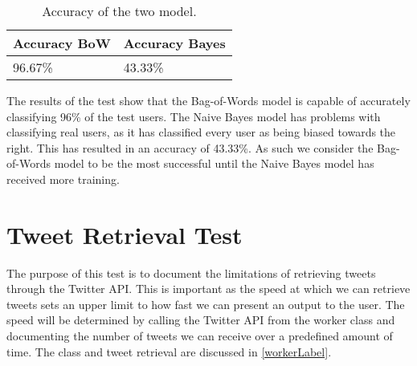 \begin{table}[H]\centering
{}
\caption{Results from the accuracy test.}
\label{speedTestReslabel}
\end{table}




\begin{table}[H]\centering
\begin{tabular}{|l|l|}\hline
\textbf{Accuracy BoW}	&	\textbf{Accuracy Bayes}	\\\hline
96.67\%					&	43.33\%					\\\hline	
\end{tabular}
\caption{Accuracy of the two model.}
\label{AccPercent}
\end{table}

The results of the test show that the Bag-of-Words model is capable of
accurately classifying 96\% of the test users. The Naive Bayes model has
problems with classifying real users, as it has classified every user as being
biased towards the right. This has resulted in an accuracy of 43.33\%. As
such we consider the Bag-of-Words model to be the most successful until the
Naive Bayes model has received more training.

\section{Tweet Retrieval Test}\label{test:tweetRetr}
The purpose of this test is to document the limitations of retrieving tweets
through the Twitter API. This is important as the speed at which we can retrieve
tweets sets an upper limit to how fast we can present an output to the user.
The speed will be determined by calling the Twitter API from the worker class
and documenting the number of tweets we can receive over a predefined amount of
time. The  class and tweet retrieval are discussed in
\autoref{workerLabel}.\nl

